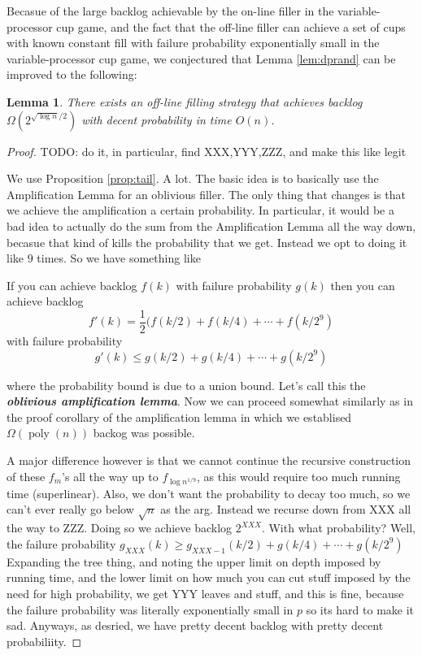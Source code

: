 \documentclass{article}[11pt]
\newcommand{\defn}[1]{{\textit{\textbf{\boldmath #1}}}}
\DeclareMathOperator{\poly}{\text{poly}}
\newtheorem{lemma}{Lemma}
\begin{document}
Becasue of the large backlog achievable by the on-line filler in the
variable-processor cup game, and the fact that the off-line filler can 
achieve a set of cups with known constant fill with failure probability
exponentially small in the variable-processor cup game, we conjectured that 
Lemma \ref{lem:dprand} can be improved to the following:
\begin{lemma}
  There exists an off-line filling strategy that achieves backlog
  $\Omega(2^{\sqrt{\log n}/2})$ with decent probability in time $O(n)$.
\end{lemma}
\begin{proof}
  {\color{red} TODO: do it, in particular, find XXX,YYY,ZZZ, and make this like legit}
  {\color{green} 
    We use Proposition \ref{prop:tail}. A lot.
    The basic idea is to basically use the Amplification Lemma for an oblivious
    filler. The only thing that changes is that we achieve the amplification a certain probability.
    In particular, it would be a bad idea to actually do the sum from the Amplification Lemma all the way down, becasue that kind of kills the probability that we get. Instead we opt to doing it like $9$ times. So we have something like 
    \begin{center}
      If you can achieve backlog $f(k)$ with failure probability $g(k)$ then you can achieve backlog 
      $$f'(k) = \frac{1}{2}(f(k/2) + f(k/4) + \cdots + f(k/2^9)$$
      with failure probability 
      $$g'(k) \le g(k/2) + g(k/4) + \cdots + g(k/2^9) $$
    \end{center} 
    where the probability bound is due to a union bound.
    Let's call this the \defn{oblivious amplification lemma}. Now we can proceed
    somewhat similarly as in the proof corollary of the amplification lemma in
    which we establised $\Omega(\poly(n))$ backog was possible.

    A major difference however is that we cannot continue the recursive
    construction of these $f_m$'s all the way up to $f_{\log n^{1/9}}$, as this would
    require too much running time (superlinear). 
    Also, we don't want the probability to decay too much, so we can't ever really go below $\sqrt{n}$ as the arg.
    Instead we recurse down from XXX all the way to ZZZ. 
    Doing so we achieve backlog $2^{XXX}$.
    With what probability?
    Well, the failure probability $g_{XXX}(k) \ge g_{XXX-1}(k/2) + g(k/4) + \cdots + g(k/2^9) $
    Expanding the tree thing, and noting the upper limit on depth imposed by running time, and the lower limit on how much you can cut stuff imposed by the need for high probability, we get YYY leaves and stuff, and this is fine, because the failure probability was literally exponentially small in $p$ so its hard to make it sad.
    Anyways, as desried, we have pretty decent backlog with pretty decent probabiliity.
  }


\end{proof}
\end{document}
